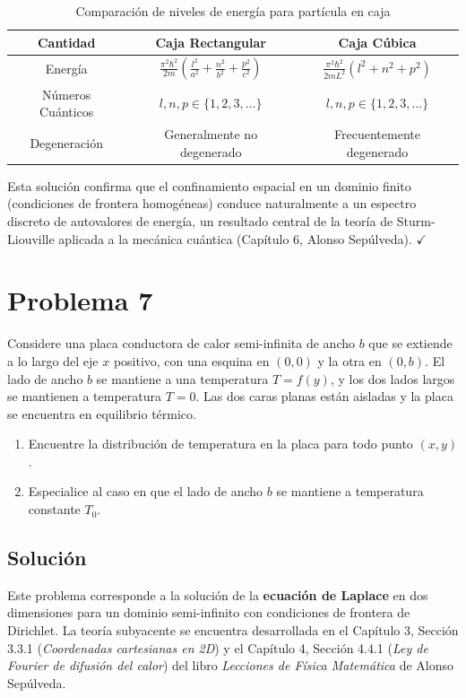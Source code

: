 \documentclass[a4paper]{article}
\begin{document}
\begin{table}[h]
\centering
\begin{tabular}{|c|c|c|}
\hline
\textbf{Cantidad} & \textbf{Caja Rectangular} & \textbf{Caja Cúbica} \\
\hline
Energía & $\frac{\pi^2 \hbar^2}{2m} \left( \frac{l^2}{a^2} + \frac{n^2}{b^2} + \frac{p^2}{c^2} \right)$ & $\frac{\pi^2 \hbar^2}{2mL^2} (l^2 + n^2 + p^2)$ \\
\hline
Números Cuánticos & $l, n, p \in \{1, 2, 3, \dots\}$ & $l, n, p \in \{1, 2, 3, \dots\}$ \\
\hline
Degeneración & Generalmente no degenerado & Frecuentemente degenerado \\
\hline
\end{tabular}
\caption{Comparación de niveles de energía para partícula en caja}
\end{table}

Esta solución confirma que el confinamiento espacial en un dominio finito (condiciones de frontera homogéneas) conduce naturalmente a un espectro discreto de autovalores de energía, un resultado central de la teoría de Sturm-Liouville aplicada a la mecánica cuántica (Capítulo 6, Alonso Sepúlveda). $\checkmark$



\section{Problema 7}
Considere una placa conductora de calor semi-infinita de ancho $b$ que se extiende a lo largo del eje $x$ positivo, con una esquina en $(0, 0)$ y la otra en $(0, b)$. El lado de ancho $b$ se mantiene a una temperatura $T = f(y)$, y los dos lados largos se mantienen a temperatura $T = 0$. Las dos caras planas están aisladas y la placa se encuentra en equilibrio térmico.

\begin{enumerate}
    \item[(a)] Encuentre la distribución de temperatura en la placa para todo punto $(x, y)$.
    \item[(b)] Especialice al caso en que el lado de ancho $b$ se mantiene a temperatura constante $T_0$.
\end{enumerate}

\subsection{Solución}

Este problema corresponde a la solución de la \textbf{ecuación de Laplace} en dos dimensiones para un dominio semi-infinito con condiciones de frontera de Dirichlet. La teoría subyacente se encuentra desarrollada en el Capítulo 3, Sección 3.3.1 (\textit{Coordenadas cartesianas en 2D}) y el Capítulo 4, Sección 4.4.1 (\textit{Ley de Fourier de difusión del calor}) del libro \textit{Lecciones de Física Matemática} de Alonso Sepúlveda.
\end{document}
